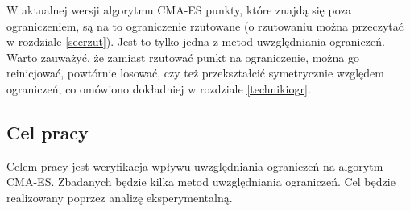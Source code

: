 \documentclass{mini}
\newcommand{\CMAES}{\mbox{CMA-ES}}
\begin{document}
W aktualnej wersji algorytmu CMA-ES punkty, które znajdą się poza ograniczeniem, są na to ograniczenie rzutowane (o rzutowaniu można przeczytać w rozdziale \ref{secrzut}). Jest to tylko jedna z metod uwzględniania ograniczeń. Warto zauważyć, że zamiast rzutować punkt na ograniczenie, można go reinicjować, powtórnie losować, czy też przekształcić symetrycznie względem ograniczeń, co omówiono dokładniej w rozdziale \ref{technikiogr}.

\subsection*{Cel pracy}
\hspace{3,4ex}Celem pracy jest weryfikacja wpływu uwzględniania ograniczeń na algorytm \CMAES. Zbadanych będzie kilka metod uwzględniania ograniczeń. Cel będzie realizowany poprzez analizę eksperymentalną.

\pagebreak
\end{document}
